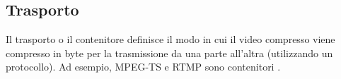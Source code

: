\subsection{Trasporto}
Il trasporto o il contenitore definisce il modo in cui il video compresso viene compresso in byte per la trasmissione da una parte all'altra (utilizzando un protocollo). Ad esempio, MPEG-TS e RTMP sono contenitori \parencite{CombinedICTTechnologies}.

